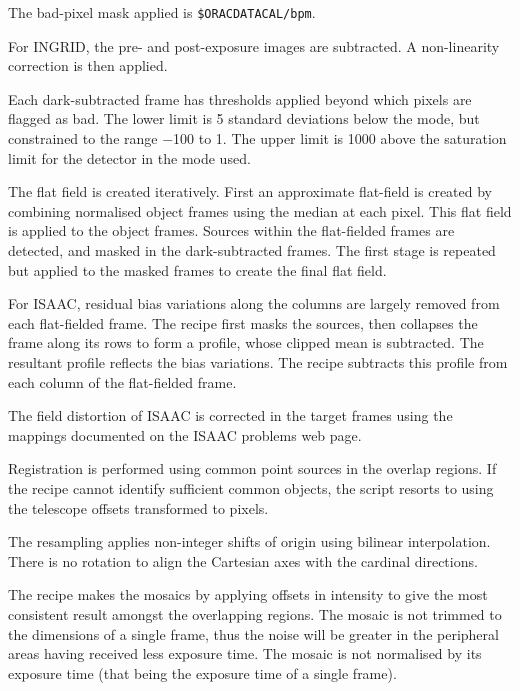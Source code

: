 \documentclass[twoside,11pt]{article}
\newcommand{\htmladdnormallink}[2]{#1}
\renewcommand{\_}{\texttt{\symbol{95}}}
\newcommand{\sstitem}{\item}
\begin{document}
{{{         \sstitem
         The bad-pixel mask applied is {\tt\$ORAC\_DATA\_CAL/bpm}.

         \sstitem
         For INGRID, the pre- and post-exposure images are subtracted.
         A non-linearity correction is then applied.

         \sstitem
         Each dark-subtracted frame has thresholds applied beyond which
         pixels are flagged as bad.  The lower limit is 5 standard
         deviations below the mode, but constrained to the range $-$100 to 1.
         The upper limit is 1000 above the saturation limit for the detector
         in the mode used.

         \sstitem
         The flat field is created iteratively.  First an approximate
         flat-field is created by combining normalised object frames using
         the median at each pixel.  This flat field is applied to the object
         frames.  Sources within the flat-fielded frames are detected, and
         masked in the dark-subtracted frames.  The first stage is repeated
         but applied to the masked frames to create the final flat field.

         \sstitem
         For ISAAC, residual bias variations along the columns are
         largely removed from each flat-fielded frame.  The recipe first
         masks the sources, then collapses the frame along its rows to form
         a profile, whose clipped mean is subtracted.  The resultant profile
         reflects the bias variations.  The recipe subtracts this profile
         from each column of the flat-fielded frame.

         \sstitem
         The field distortion of ISAAC is corrected in the target frames
         using the mappings documented on the 
         \htmladdnormallink{ISAAC problems web page}
         {http://www.eso.org/instruments/isaac/problems_tips.html}.

         \sstitem
         Registration is performed using common point sources in the
         overlap regions.  If the recipe cannot identify sufficient common
         objects, the script resorts to using the telescope offsets
         transformed to pixels.

         \sstitem
         The resampling applies non-integer shifts of origin using
         bilinear interpolation.  There is no rotation to align the
         Cartesian axes with the cardinal directions.

         \sstitem
         The recipe makes the mosaics by applying offsets in intensity
         to give the most consistent result amongst the overlapping regions.
         The mosaic is not trimmed to the dimensions of a single frame, thus
         the noise will be greater in the peripheral areas having received
         less exposure time.  The mosaic is not normalised by its exposure
         time (that being the exposure time of a single frame).

}}}
\end{document}
